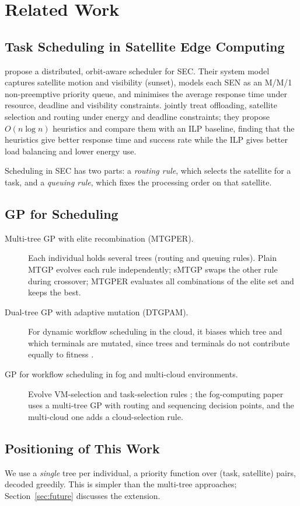 \chapter{Related Work}
\label{ch:related}

\section{Task Scheduling in Satellite Edge Computing}
\citet{magliarisi2025orbit} propose a distributed, orbit-aware scheduler for SEC.
Their system model captures satellite motion and visibility (sunset), models
each SEN as an M/M/1 non-preemptive priority queue, and minimises the average
response time under resource, deadline and visibility constraints.
\citet{icdcs_sc} jointly treat offloading, satellite selection and routing under
energy and deadline constraints; they propose $O(n\log n)$ heuristics and
compare them with an ILP baseline, finding that the heuristics give better
response time and success rate while the ILP gives better load balancing and
lower energy use.

Scheduling in SEC has two parts: a \emph{routing rule}, which selects the
satellite for a task, and a \emph{queuing rule}, which fixes the processing
order on that satellite.

\section{GP for Scheduling}
\begin{description}
  \item[Multi-tree GP with elite recombination (MTGPER).] Each individual holds
        several trees (routing and queuing rules). Plain MTGP evolves each rule
        independently; sMTGP swaps the other rule during crossover; MTGPER
        evaluates all combinations of the elite set and keeps the best. 
  \item[Dual-tree GP with adaptive mutation (DTGPAM).] For dynamic workflow
        scheduling in the cloud, it biases which tree and which terminals are
        mutated, since trees and terminals do not contribute equally to fitness
        \citep{dtgpam}.
  \item[GP for workflow scheduling in fog and multi-cloud environments.]
        Evolve VM-selection and task-selection rules \citep{gp_fog,mtgp_multicloud}; the fog-computing paper uses a multi-tree GP with routing and sequencing decision points, and the multi-cloud one adds a cloud-selection rule.
\end{description}

\section{Positioning of This Work}
We use a \emph{single} tree per individual, a priority function over
(task, satellite) pairs, decoded greedily. This is simpler than the multi-tree
approaches; Section~\ref{sec:future} discusses the extension.

